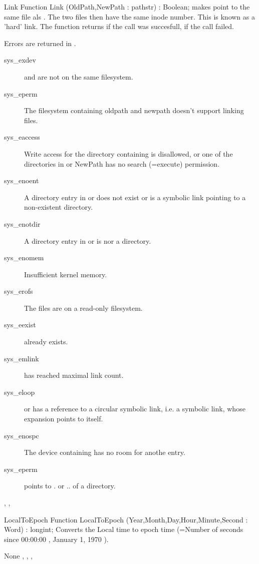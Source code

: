 \begin{function}{Link}
\Declaration
Function Link (OldPath,NewPath : pathstr) : Boolean;
\Description
{} makes  point to the same file als . The two files
then have the same inode number. This is known as a 'hard' link.
The function returns  if the call was succesfull,  if the call
failed.

\Errors
 Errors are returned in .
\begin{description}
\item[sys\_exdev]  and  are not on the same
filesystem.
\item[sys\_eperm] The filesystem containing oldpath and newpath doesn't
support linking files.
\item[sys\_eaccess] Write access for the directory containing 
is disallowed, or one of the directories in  or {NewPath} has no
search (=execute) permission.
\item[sys\_enoent] A directory entry in  or  does
not exist or is a symbolic link pointing to a non-existent directory.
\item[sys\_enotdir] A directory entry in  or  is
nor a directory.
\item[sys\_enomem] Insufficient kernel memory.
\item[sys\_erofs] The files are on a read-only filesystem.
\item[sys\_eexist]  already exists.
\item[sys\_emlink]  has reached maximal link count.
\item[sys\_eloop]  or  has a reference to a circular
symbolic link, i.e. a symbolic link, whose expansion points to itself.
\item[sys\_enospc] The device containing  has no room for anothe
entry.
\item[sys\_eperm]  points to . or .. of a directory.
\end{description}

\SeeAlso
{}, ,  
\end{function}


\begin{function}{LocalToEpoch}
\Declaration
Function LocalToEpoch (Year,Month,Day,Hour,Minute,Second : Word) : longint;
\Description
Converts the Local time to epoch time (=Number of seconds since 00:00:00 , January 1,
1970 ).

\Errors
None
\SeeAlso
{}, , , 
\end{function}

